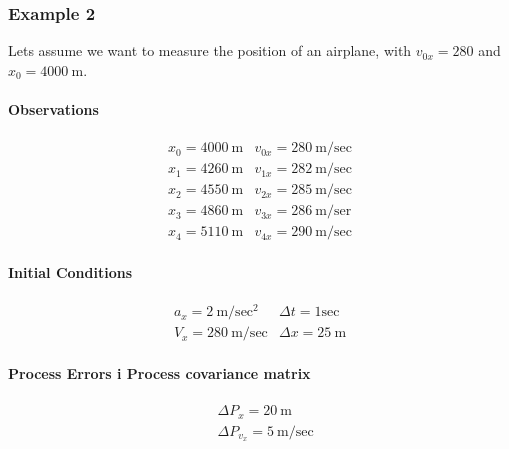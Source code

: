 \subsubsection{Example 2}
Lets assume we want to measure the position of an airplane, with $v_{0 x}=280$ and $x_0=4000\mathrm{~m}$.
\paragraph{Observations}
$$
\begin{array}{ll}
x_0=4000 \mathrm{~m} & v_{0 x}=280 \mathrm{~m} / \mathrm{sec} \\
x_1=4260 \mathrm{~m} & v_{1 x}=282 \mathrm{~m} / \mathrm{sec} \\
x_2=4550 \mathrm{~m} & v_{2 x}=285 \mathrm{~m} / \mathrm{sec} \\
x_3=4860 \mathrm{~m} & v_{3 x}=286 \mathrm{~m} / \mathrm{ser} \\
x_4=5110 \mathrm{~m} & v_{4 x}=290 \mathrm{~m} / \mathrm{sec}
\end{array}
$$
\paragraph{Initial Conditions}
$$
\begin{array}{ll}
a_x=2 \mathrm{~m} / \mathrm{sec}^2 & \Delta t=1 \mathrm{sec} \\
V_x=280 \mathrm{~m} / \mathrm{sec} & \Delta x=25 \mathrm{~m}
\end{array}
$$
\paragraph{Process Errors i Process covariance matrix}
$$
\begin{aligned}
&\Delta P_x=20 \mathrm{~m} \\
&\Delta P_{v_x}=5 \mathrm{~m} / \mathrm{sec}
\end{aligned}
$$

